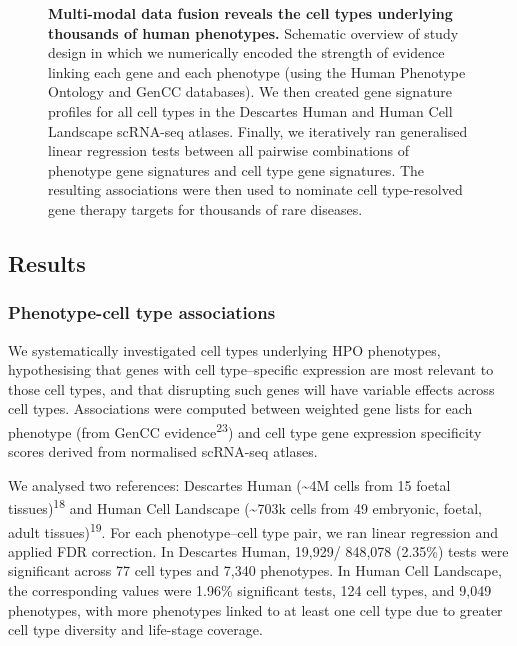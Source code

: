 \documentclass[
]{article}
\begin{document}
\begin{figure}
{}

\caption{\label{fig-study-design}\textbf{Multi-modal data fusion reveals
the cell types underlying thousands of human phenotypes.} Schematic
overview of study design in which we numerically encoded the strength of
evidence linking each gene and each phenotype (using the Human Phenotype
Ontology and GenCC databases). We then created gene signature profiles
for all cell types in the Descartes Human and Human Cell Landscape
scRNA-seq atlases. Finally, we iteratively ran generalised linear
regression tests between all pairwise combinations of phenotype gene
signatures and cell type gene signatures. The resulting associations
were then used to nominate cell type-resolved gene therapy targets for
thousands of rare diseases.}

\end{figure}%

\subsection{Results}\label{sec-results}

\subsubsection{Phenotype-cell type
associations}\label{phenotype-cell-type-associations}

We systematically investigated cell types underlying HPO phenotypes,
hypothesising that genes with cell type--specific expression are most
relevant to those cell types, and that disrupting such genes will have
variable effects across cell types. Associations were computed between
weighted gene lists for each phenotype (from GenCC
evidence\textsuperscript{23}) and cell type gene expression specificity
scores derived from normalised scRNA-seq atlases.

We analysed two references: Descartes Human (\textasciitilde4M cells
from 15 foetal tissues)\textsuperscript{18} and Human Cell Landscape
(\textasciitilde703k cells from 49 embryonic, foetal, adult
tissues)\textsuperscript{19}. For each phenotype--cell type pair, we ran
linear regression and applied FDR correction. In Descartes Human,
19,929/ 848,078 (2.35\%) tests were significant across 77 cell types and
7,340 phenotypes. In Human Cell Landscape, the corresponding values were
1.96\% significant tests, 124 cell types, and 9,049 phenotypes, with
more phenotypes linked to at least one cell type due to greater cell
type diversity and life-stage coverage.
\end{document}
